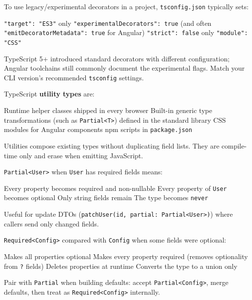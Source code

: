 \question[4]
To use legacy/experimental decorators in a project, \texttt{tsconfig.json} typically sets:
\begin{choices}
  \choice \texttt{"target": "ES3"} only
  \CorrectChoice \texttt{"experimentalDecorators": true} (and often \texttt{"emitDecoratorMetadata": true} for Angular)
  \choice \texttt{"strict": false} only
  \choice \texttt{"module": "CSS"}
\end{choices}
\begin{solution}
  TypeScript 5+ introduced standard decorators with different configuration; Angular toolchains still commonly document the experimental flags. Match your CLI version's recommended \texttt{tsconfig} settings.
\end{solution}

\question[4]
TypeScript \textbf{utility types} are:
\begin{choices}
  \choice Runtime helper classes shipped in every browser
  \CorrectChoice Built-in generic type transformations (such as \lstinline[style=tsinline]|Partial<T>|) defined in the standard library
  \choice CSS modules for Angular components
  \choice npm scripts in \texttt{package.json}
\end{choices}
\begin{solution}
  Utilities compose existing types without duplicating field lists. They are compile-time only and erase when emitting JavaScript.
\end{solution}

\question[4]
\lstinline[style=tsinline]|Partial<User>| when \lstinline[style=tsinline]|User| has required fields means:
\begin{choices}
  \choice Every property becomes required and non-nullable
  \CorrectChoice Every property of \lstinline[style=tsinline]|User| becomes optional
  \choice Only string fields remain
  \choice The type becomes \lstinline[style=tsinline]|never|
\end{choices}
\begin{solution}
  Useful for update DTOs (\lstinline[style=tsinline]|patchUser(id, partial: Partial<User>)|) where callers send only changed fields.
\end{solution}

\question[4]
\lstinline[style=tsinline]|Required<Config>| compared with \lstinline[style=tsinline]|Config| when some fields were optional:
\begin{choices}
  \choice Makes all properties optional
  \CorrectChoice Makes every property required (removes optionality from \lstinline[style=tsinline]|?| fields)
  \choice Deletes properties at runtime
  \choice Converts the type to a union only
\end{choices}
\begin{solution}
  Pair with \lstinline[style=tsinline]|Partial| when building defaults: accept \lstinline[style=tsinline]|Partial<Config>|, merge defaults, then treat as \lstinline[style=tsinline]|Required<Config>| internally.
\end{solution}

